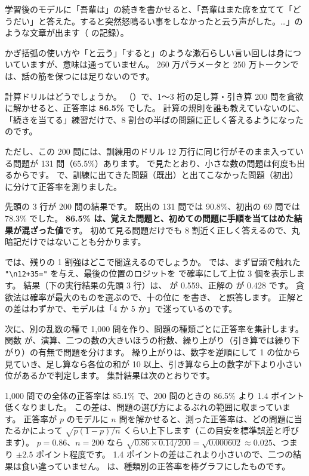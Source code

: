 学習後のモデルに「吾輩は」の続きを書かせると、「吾輩はまた席を立てて「どうだい」と答えた。すると突然怒鳴るい事をしなかったと云う声がした。…」のような文章が出ます（ の記録）。

かぎ括弧の使い方や「と云う」「すると」のような漱石らしい言い回しは身についていますが、意味は通っていません。
260 万パラメータと 250 万トークンでは、話の筋を保つには足りないのです。

計算ドリルはどうでしょうか。
（）で、1〜3 桁の足し算・引き算 200 問を貪欲に解かせると、正答率は \textbf{86.5\%} でした。
計算の規則を誰も教えていないのに、「続きを当てる」練習だけで、8 割台の半ばの問題に正しく答えるようになったのです。

ただし、この 200 問には、訓練用のドリル 12 万行に同じ行がそのまま入っている問題が 131 問（65.5\%）あります。
で見たとおり、小さな数の問題は何度も出るからです。
 で、訓練に出てきた問題（既出）と出てこなかった問題（初出）に分けて正答率を測りました。


先頭の 3 行が 200 問の結果です。
既出の 131 問では 90.8\%、初出の 69 問では 78.3\% でした。
\textbf{86.5\% は、覚えた問題と、初めての問題に手順を当てはめた結果が混ざった値}です。
初めて見る問題だけでも 8 割近く正しく答えるので、丸暗記だけではないことも分かります。

では、残りの 1 割強はどこで間違えるのでしょうか。
 では、まず冒頭で触れた \texttt{"\textbackslash n12+35="} を与え、最後の位置のロジットを  で確率にして上位 3 個を表示します。
結果（下の実行結果の先頭 3 行）は、 が 0.559、正解の  が 0.428 です。
貪欲法は確率が最大のものを選ぶので、十の位に  を書き、 と誤答します。
正解との差はわずかで、モデルは「4 か 5 か」で迷っているのです。

次に、別の乱数の種で 1,000 問を作り、問題の種類ごとに正答率を集計します。
関数  が、演算、二つの数の大きいほうの桁数、繰り上がり（引き算では繰り下がり）の有無で問題を分けます。
繰り上がりは、数字を逆順にして 1 の位から見ていき、足し算なら各位の和が 10 以上、引き算なら上の数字が下より小さい位があるかで判定します。
集計結果は次のとおりです。


1,000 問での全体の正答率は 85.1\% で、200 問のときの 86.5\% より 1.4 ポイント低くなりました。
この差は、問題の選び方によるぶれの範囲に収まっています。
正答率が $p$ のモデルに $n$ 問を解かせると、測った正答率は、どの問題に当たるかによって $\sqrt{p(1-p)/n}$ くらい上下します（この目安を標準誤差と呼びます）。
$p=0.86$、$n=200$ なら $\sqrt{0.86\times0.14/200}=\sqrt{0.000602}\approx0.025$、つまり $\pm2.5$ ポイント程度です。
1.4 ポイントの差はこれより小さいので、二つの結果は食い違っていません。
は、種類別の正答率を棒グラフにしたものです。

